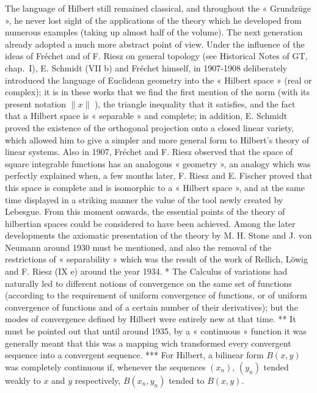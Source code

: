 The language of Hilbert still remained classical, and throughout the « Grundzüge », he never lost sight of the applications of the theory which he developed from numerous examples (taking up almost half of the volume). The next generation already adopted a much more abstract point of view. Under the influence of the ideas of Fréchet and of F. Riesz on general topology (see Historical Notes of GT, chap.~I), E. Schmidt (VII b) and Fréchet himself, in 1907-1908 deliberately introduced the language of Euclidean geometry into the « Hilbert space » (real or complex); it is in these works that we find the first mention of the norm (with its present notation \(\| x \|\) ), the triangle inequality that it satisfies, and the fact that a Hilbert space is « separable » and complete; in addition, E. Schmidt proved the existence of the orthogonal projection onto a closed linear variety, which allowed him to give a simpler and more general form to Hilbert's theory of linear systems. Also in 1907, Fréchet and F. Riesz observed that the space of square integrable functions has an analogous « geometry », an analogy which was perfectly explained when, a few months later, F. Riesz and E. Fischer proved that this space is complete and is isomorphic to a « Hilbert space », and at the same time displayed in a striking manner the value of the tool newly created by Lebesgue. From this moment onwards, the essential points of the theory of hilbertian spaces could be considered to have been achieved. Among the later developments the axiomatic presentation of the theory by M. H. Stone and J. von Neumann around 1930 must be mentioned, and also the removal of the restrictions of « separability » which was the result of the work of Rellich, Löwig and F. Riesz (IX e) around the year 1934.
* The Calculus of variations had naturally led to different notions of convergence on the same set of functions (according to the requirement of uniform convergence of functions, or of uniform convergence of functions and of a certain number of their derivatives); but the modes of convergence defined by Hilbert were entirely new at that time.
** It must be pointed out that until around 1935, by a « continuous » function it was generally meant that this was a mapping wich transformed every convergent sequence into a convergent sequence.
*** For Hilbert, a bilinear form \(B(x, y)\) was completely continuous if, whenever the sequences \((x_{n})\), \((y_{n})\) tended weakly to \(x\) and \(y\) respectively, \(B(x_{n}, y_{n})\) tended to \(B(x, y)\).

